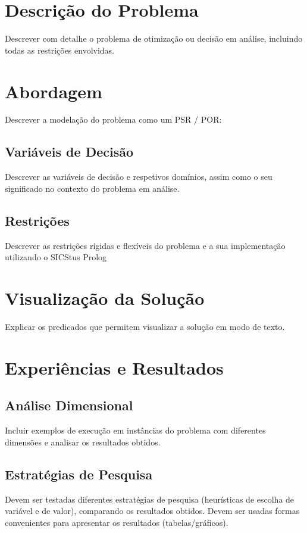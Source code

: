 \documentclass[11pt]{article}
\begin{document}
\section{Descrição do Problema} Descrever com detalhe o problema de
otimização ou decisão em análise, incluindo todas as restrições envolvidas.


\section{Abordagem} Descrever a modelação do problema como um PSR / POR:

\subsection{Variáveis de Decisão} Descrever as variáveis de decisão e
respetivos domínios, assim como o seu significado no contexto do problema em análise.

\subsection{Restrições} Descrever as restrições rígidas e flexíveis do problema e a
sua implementação utilizando o SICStus Prolog

\section{Visualização da Solução} Explicar os predicados que permitem
visualizar a solução em modo de texto.

\section{Experiências e Resultados}

\subsection{Análise Dimensional} Incluir exemplos de execução em instâncias do problema com
diferentes dimensões e analisar os resultados obtidos.

\subsection{Estratégias de Pesquisa} Devem ser testadas diferentes estratégias de pesquisa
(heurísticas de escolha de variável e de valor), comparando os resultados obtidos.
Devem ser usadas formas convenientes para apresentar os resultados (tabelas/gráficos).
\end{document}
